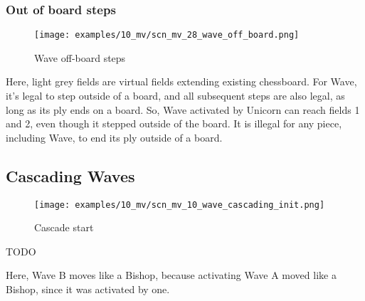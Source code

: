 \clearpage %

\subsubsection*{Out of board steps}

\vspace*{-1.4\baselineskip}
\noindent
\begin{figure}[!h]
\texttt{[image: examples/10\_mv/scn\_mv\_28\_wave\_off\_board.png]}
\caption{Wave off-board steps}
\label{fig:scn_mv_28_wave_off_board}
\end{figure}

Here, light grey fields are virtual fields extending existing chessboard.
For Wave, it's legal to step outside of a board, and all subsequent steps
are also legal, as long as its ply ends on a board. So, Wave activated by
Unicorn can reach fields 1 and 2, even though it stepped outside of the
board. It is illegal for any piece, including Wave, to end its ply outside
of a board.

\clearpage %

\subsection*{Cascading Waves}

\vspace*{-1.4\baselineskip}
\noindent
\begin{figure}[h]
\texttt{[image: examples/10\_mv/scn\_mv\_10\_wave\_cascading\_init.png]}
\caption{Cascade start}
\label{fig:scn_mv_10_wave_cascading_init}
\end{figure}

\huge
TODO
\normalsize


Here, Wave B moves like a Bishop, because activating Wave A moved like a Bishop,
since it was activated by one.

\clearpage %

